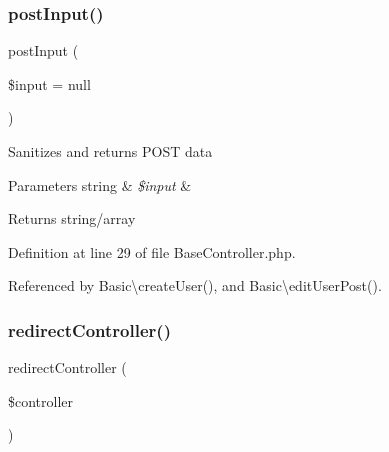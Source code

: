 \subsubsection{\texorpdfstring{post\+Input()}{postInput()}}
{\footnotesize\ttfamily post\+Input (\begin{DoxyParamCaption}\item[{}]{\$input = {\ttfamily null} }\end{DoxyParamCaption})\hspace{0.3cm}{\ttfamily [protected]}}

Sanitizes and returns P\+O\+ST data


\begin{DoxyParams}[1]{Parameters}
string & {\em \$input} & \\
\hline
\end{DoxyParams}
\begin{DoxyReturn}{Returns}
string/array 
\end{DoxyReturn}


Definition at line 29 of file Base\+Controller.\+php.



Referenced by Basic\textbackslash{}create\+User(), and Basic\textbackslash{}edit\+User\+Post().


\hypertarget{class_base_controller_a85ddb683efc64655be063b697f631beb}{}\label{class_base_controller_a85ddb683efc64655be063b697f631beb} 
\subsubsection{\texorpdfstring{redirect\+Controller()}{redirectController()}}
{\footnotesize\ttfamily redirect\+Controller (\begin{DoxyParamCaption}\item[{}]{\$controller }\end{DoxyParamCaption})\hspace{0.3cm}{\ttfamily [protected]}}

